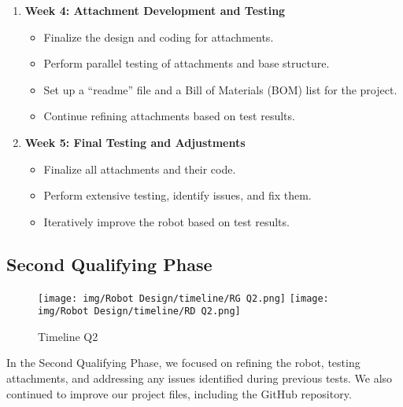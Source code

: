 \begin{enumerate}[1.]
    \item \textbf{Week 4: Attachment Development and Testing}
    \begin{itemize}
        \item Finalize the design and coding for attachments.
        \item Perform parallel testing of attachments and base structure.
        \item Set up a “readme” file and a Bill of Materials (BOM) list for the project.
        \item Continue refining attachments based on test results.
    \end{itemize}

    \item \textbf{Week 5: Final Testing and Adjustments}
    \begin{itemize}
        \item Finalize all attachments and their code.
        \item Perform extensive testing, identify issues, and fix them.
        \item Iteratively improve the robot based on test results.
    \end{itemize}
\end{enumerate}

\subsection{Second Qualifying Phase}

\begin{figure}[ht]
    \centering
    \texttt{[image: img/Robot Design/timeline/RG Q2.png]}  
    \texttt{[image: img/Robot Design/timeline/RD Q2.png]}  
    \caption{Timeline Q2}
    \label{fig:timeline}
\end{figure}

In the Second Qualifying Phase, we focused on refining the robot, testing attachments, and addressing any issues identified during previous tests. We also continued to improve our project files, including the GitHub repository.


